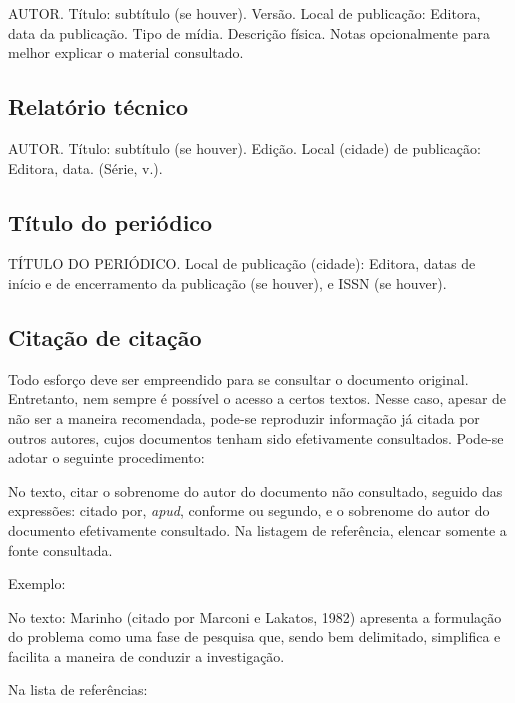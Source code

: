 AUTOR. Título: subtítulo (se houver). Versão. Local de publicação: Editora, data da publicação. Tipo de mídia. Descrição física. Notas opcionalmente para melhor explicar o material consultado.


\subsection{Relatório técnico}

AUTOR. Título: subtítulo (se houver). Edição. Local (cidade) de publicação: Editora, data. (Série, v.).



\subsection{Título do periódico}

TÍTULO DO PERIÓDICO. Local de publicação (cidade): Editora, datas de início e de encerramento da publicação (se houver), e ISSN (se houver).



\subsection{Citação de citação}

Todo esforço deve ser empreendido para se consultar o documento original. Entretanto, nem sempre é possível o acesso a certos textos. Nesse caso, apesar de não ser a maneira recomendada, pode-se reproduzir informação já citada por outros autores, cujos documentos tenham sido efetivamente consultados. Pode-se adotar o seguinte procedimento:

No texto, citar o sobrenome do autor do documento não consultado, seguido das expressões: citado por, \textit{apud}, conforme ou segundo, e o sobrenome do autor do documento efetivamente consultado. Na listagem de referência, elencar somente a fonte consultada.

Exemplo:

No texto: Marinho (citado por Marconi e Lakatos, 1982) apresenta a formulação do problema como uma fase de pesquisa que, sendo bem delimitado, simplifica e facilita a maneira de conduzir a investigação.

Na lista de referências:

